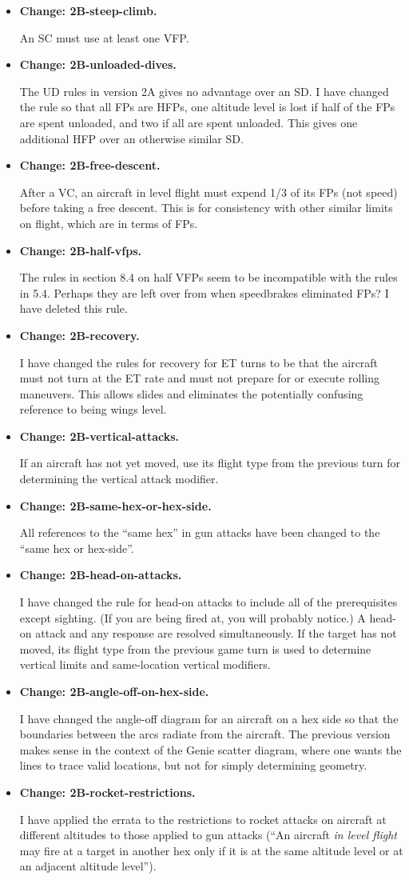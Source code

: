 \documentclass[10pt]{report}
\newcommand{\itemtag}[1]{\item \textbf{Change: #1.}\par}
\begin{document}
\begin{itemize}
    \itemtag{2B-steep-climb} An SC must use at least one VFP.

    \itemtag{2B-unloaded-dives} The UD rules in version 2A gives no advantage over an SD. I have changed the rule so that all FPs are HFPs, one altitude level is lost if half of the FPs are spent unloaded, and two if all are spent unloaded. This gives one additional HFP over an otherwise similar SD.    

    \itemtag{2B-free-descent} After a VC, an aircraft in level flight must expend 1/3 of its FPs (not speed) before taking a free descent. This is for consistency with other similar limits on flight, which are in terms of FPs.

    \itemtag{2B-half-vfps} The rules in section 8.4 on half VFPs seem to be incompatible with the rules in 5.4. Perhaps they are left over from when speedbrakes eliminated FPs? I have deleted this rule.
    
    \itemtag{2B-recovery} I have changed the rules for recovery for ET turns to be that the aircraft must not turn at the ET rate and must not prepare for or execute rolling maneuvers. This allows slides and eliminates the potentially confusing reference to being wings level.

    \itemtag{2B-vertical-attacks} If an aircraft has not yet moved, use its flight type from the previous turn for determining the vertical attack modifier.
    
    \itemtag{2B-same-hex-or-hex-side} All references to the “same hex” in gun attacks have been changed to the “same hex or hex-side”.

    \itemtag{2B-head-on-attacks} I have changed the rule for head-on attacks to include all of the prerequisites except sighting. (If you are being fired at, you will probably notice.) A head-on attack and any response are resolved simultaneously. If the target has not moved, its flight type from the previous game turn is used to determine vertical limits and same-location vertical modifiers.

    \itemtag{2B-angle-off-on-hex-side} I have changed the angle-off diagram for an aircraft on a hex side so that the boundaries between the arcs radiate from the aircraft. The previous version makes sense in the context of the Genie scatter diagram, where one wants the lines to trace valid locations, but not for simply determining geometry.

    \itemtag{2B-rocket-restrictions} I have applied the errata to the restrictions to rocket attacks on aircraft at different altitudes to those applied to gun attacks (“An aircraft \emph{in level flight} may fire at a target in another hex only if it is at the same altitude level or at an adjacent altitude level”).


\end{itemize}
\end{document}
